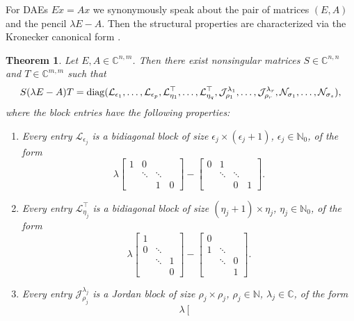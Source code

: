 \documentclass[11pt]{article}
\newtheorem{theorem}{Theorem}
\newcommand{\diag}     {\mathop{\rm diag}\nolimits}
\begin{document}
For DAEs $E\dot x=Ax$  we synonymously speak about the pair of matrices $(E,A)$ and the pencil $\lambda E-A$. Then the structural properties are characterized via the Kronecker canonical form \cite{Gan59a}.
%
\begin{theorem}\label{th:kcf}
Let $E,A\in {\mathbb C}^{n,m}$. Then there exist nonsingular matrices
$S\in {\mathbb C}^{n,n}$ and $T\in {\mathbb C}^{m,m}$ such that
%
\begin{equation}\label{kcf}
S(\lambda E-A)T=\diag({\mathcal L}_{\epsilon_1},\ldots,{\mathcal L}_{\epsilon_p},
{\mathcal L}^\top_{\eta_1},\ldots,{\mathcal L}^\top_{\eta_q},
{\mathcal J}_{\rho_1}^{\lambda_1},\ldots,{\mathcal J}_{\rho_r}^{\lambda_r},{\mathcal N}_{\sigma_1},\ldots,
{\mathcal N}_{\sigma_s}),
\end{equation}
%
where the block entries have the following properties:
%
\begin{enumerate}
\item[\rm (i)]
Every entry ${\mathcal L}_{\epsilon_j}$ is a bidiagonal block of size
${\epsilon_j}\times ({\epsilon_j+1})$, $\epsilon_j\in{\mathbb N}_0$,
of the form
\[
\lambda\left[\begin{array}{cccc}
1&0\\&\ddots&\ddots\\&&1&0
\end{array}\right]-\left[\begin{array}{cccc}
0&1\\&\ddots&\ddots\\&&0&1
\end{array}\right].
\]
\item[\rm (ii)]
Every entry ${\mathcal L}^\top_{\eta_j}$ is a bidiagonal block of size
$({\eta_j+1})\times {\eta_j}$, $\eta_j\in{\mathbb N}_0$,
of the form
\[
\lambda\left[\begin{array}{ccc}
1\\0&\ddots\\&\ddots&1\\&&0
\end{array}\right]-
\left[\begin{array}{ccc}
0\\1&\ddots\\&\ddots&0\\&&1
\end{array}\right].
\]
\item[\rm (iii)]
Every entry ${\mathcal J}_{\rho_j}^{\lambda_j}$ is a Jordan block of size
${\rho_j}\times{\rho_j}$, $\rho_j\in{\mathbb N}$, $\lambda_j\in{\mathbb C}$,
of the form
\[
\lambda\left[\begin{array}{cccc}

\end{array}\]
\end{enumerate}
\end{theorem}
\end{document}
